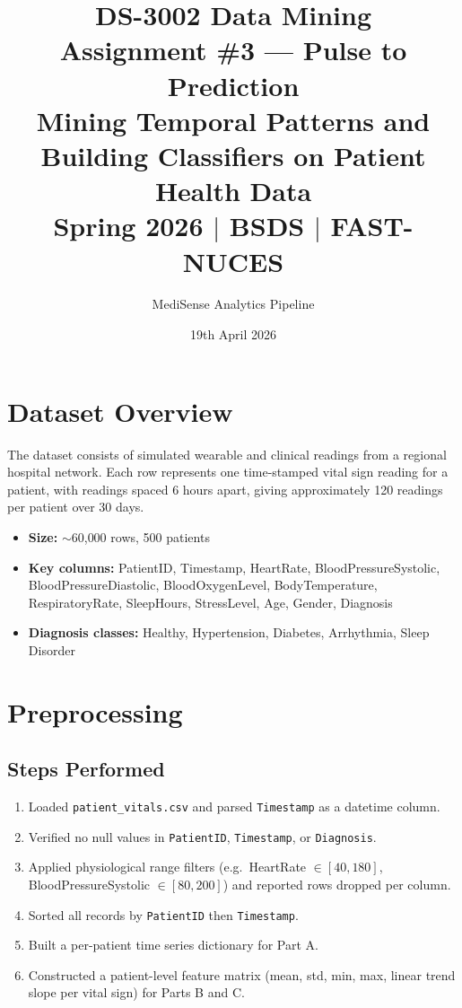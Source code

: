 \documentclass[12pt,a4paper]{article}
\title{
    \textbf{DS-3002 Data Mining} \\[0.4em]
    \large Assignment \#3 --- Pulse to Prediction \\[0.2em]
    \normalsize Mining Temporal Patterns and Building Classifiers on Patient Health Data \\[1em]
    \normalsize Spring 2026 $|$ BSDS $|$ FAST-NUCES
}
\author{MediSense Analytics Pipeline}
\date{19th April 2026}
\begin{document}
\maketitle
\tableofcontents
\newpage

\section{Dataset Overview}

The dataset consists of simulated wearable and clinical readings from a regional
hospital network. Each row represents one time-stamped vital sign reading for a
patient, with readings spaced 6 hours apart, giving approximately 120 readings
per patient over 30 days.

\begin{itemize}
    \item \textbf{Size:} $\sim$60{,}000 rows, 500 patients
    \item \textbf{Key columns:} PatientID, Timestamp, HeartRate,
          BloodPressureSystolic, BloodPressureDiastolic, BloodOxygenLevel,
          BodyTemperature, RespiratoryRate, SleepHours, StressLevel, Age,
          Gender, Diagnosis
    \item \textbf{Diagnosis classes:} Healthy, Hypertension, Diabetes,
          Arrhythmia, Sleep Disorder
\end{itemize}

\section{Preprocessing}

\subsection{Steps Performed}
\begin{enumerate}
    \item Loaded \texttt{patient\_vitals.csv} and parsed \texttt{Timestamp} as
          a datetime column.
    \item Verified no null values in \texttt{PatientID}, \texttt{Timestamp}, or
          \texttt{Diagnosis}.
    \item Applied physiological range filters (e.g.\ HeartRate $\in [40,180]$,
          BloodPressureSystolic $\in [80,200]$) and reported rows dropped per
          column.
    \item Sorted all records by \texttt{PatientID} then \texttt{Timestamp}.
    \item Built a per-patient time series dictionary for Part A.
    \item Constructed a patient-level feature matrix (mean, std, min, max,
          linear trend slope per vital sign) for Parts B and C.
\end{enumerate}
\end{document}
